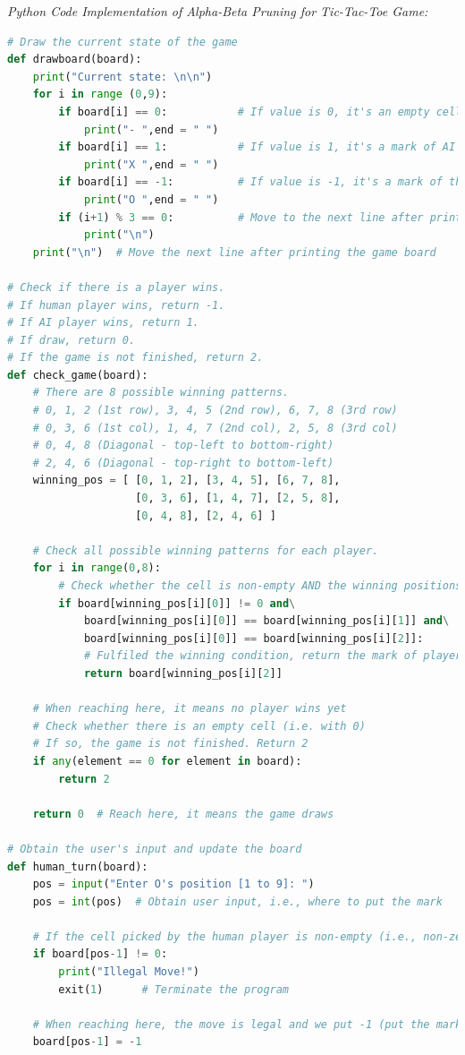 \documentclass{book}
\begin{document}
\newpage
\textit{\large{Python Code Implementation of Alpha-Beta Pruning for Tic-Tac-Toe Game:}}\\
\begin{lstlisting}[language=Python, basicstyle=\ttfamily\small, keywordstyle=\color{blue}, commentstyle=\color{forestgreen}, stringstyle=\color{red}, showstringspaces=false]
# Draw the current state of the game
def drawboard(board):
    print("Current state: \n\n")
    for i in range (0,9):
        if board[i] == 0:           # If value is 0, it's an empty cell
            print("- ",end = " ")
        if board[i] == 1:           # If value is 1, it's a mark of AI
            print("X ",end = " ")
        if board[i] == -1:          # If value is -1, it's a mark of the human
            print("O ",end = " ")
        if (i+1) % 3 == 0:          # Move to the next line after printing 3 elements
            print("\n")
    print("\n")  # Move the next line after printing the game board

# Check if there is a player wins.
# If human player wins, return -1.
# If AI player wins, return 1.
# If draw, return 0.
# If the game is not finished, return 2.
def check_game(board):
    # There are 8 possible winning patterns.
    # 0, 1, 2 (1st row), 3, 4, 5 (2nd row), 6, 7, 8 (3rd row)
    # 0, 3, 6 (1st col), 1, 4, 7 (2nd col), 2, 5, 8 (3rd col)
    # 0, 4, 8 (Diagonal - top-left to bottom-right)
    # 2, 4, 6 (Diagonal - top-right to bottom-left)
    winning_pos = [ [0, 1, 2], [3, 4, 5], [6, 7, 8],
                    [0, 3, 6], [1, 4, 7], [2, 5, 8],
                    [0, 4, 8], [2, 4, 6] ]

    # Check all possible winning patterns for each player.
    for i in range(0,8):
        # Check whether the cell is non-empty AND the winning positions with the same mark
        if board[winning_pos[i][0]] != 0 and\
            board[winning_pos[i][0]] == board[winning_pos[i][1]] and\
            board[winning_pos[i][0]] == board[winning_pos[i][2]]:
            # Fulfiled the winning condition, return the mark of player
            return board[winning_pos[i][2]]

    # When reaching here, it means no player wins yet
    # Check whether there is an empty cell (i.e. with 0)
    # If so, the game is not finished. Return 2
    if any(element == 0 for element in board):
        return 2

    return 0  # Reach here, it means the game draws

# Obtain the user's input and update the board
def human_turn(board):
    pos = input("Enter O's position [1 to 9]: ")
    pos = int(pos)  # Obtain user input, i.e., where to put the mark

    # If the cell picked by the human player is non-empty (i.e., non-zero), illegal
    if board[pos-1] != 0:
        print("Illegal Move!")
        exit(1)      # Terminate the program

    # When reaching here, the move is legal and we put -1 (put the mark of human player)
    board[pos-1] = -1
\end{lstlisting}
\end{document}
